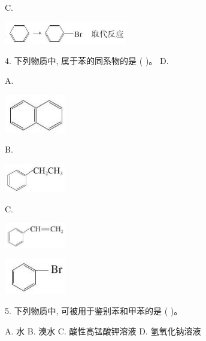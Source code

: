\documentclass[10pt]{article}
\begin{document}
C.

\begin{center}
\includegraphics[max width=0.4\textwidth]{images/0190efc5-b58a-7c43-bfb0-e0a030df9cfd_53_984622.jpg}
\end{center}

4. 下列物质中, 属于苯的同系物的是 ( )。 D.

A.

\begin{center}
\includegraphics[max width=0.2\textwidth]{images/0190efc5-b58a-7c43-bfb0-e0a030df9cfd_54_813664.jpg}
\end{center}

B.

\begin{center}
\includegraphics[max width=0.2\textwidth]{images/0190efc5-b58a-7c43-bfb0-e0a030df9cfd_54_733664.jpg}
\end{center}

C.

\begin{center}
\includegraphics[max width=0.2\textwidth]{images/0190efc5-b58a-7c43-bfb0-e0a030df9cfd_54_871399.jpg}
\end{center}

\begin{center}
\includegraphics[max width=0.2\textwidth]{images/0190efc5-b58a-7c43-bfb0-e0a030df9cfd_54_986891.jpg}
\end{center}

5. 下列物质中, 可被用于鉴别苯和甲苯的是 ( )。

A. 水 B. 溴水 C. 酸性高锰酸钾溶液 D. 氢氧化钠溶液
\end{document}
